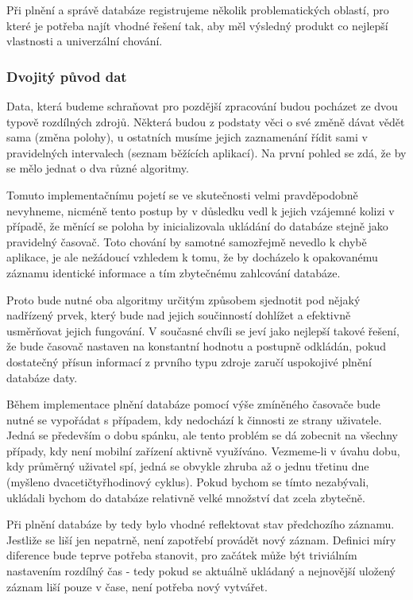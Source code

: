 \documentclass[thesis=M,czech]{FITthesis}[2012/06/26]
\begin{document}
Při plnění a správě databáze registrujeme několik problematických oblastí, pro které je potřeba najít vhodné řešení tak, aby měl výsledný produkt co nejlepší vlastnosti a univerzální chování.

\subsubsection*{Dvojitý původ dat}
Data, která budeme schraňovat pro pozdější zpracování budou pocházet ze dvou typově rozdílných zdrojů. Některá budou z podstaty věci o své změně dávat vědět sama (změna polohy), u ostatních musíme jejich zaznamenání řídit sami v pravidelných intervalech (seznam běžících aplikací). Na první pohled se zdá, že by se mělo jednat o dva různé algoritmy.

Tomuto implementačnímu pojetí se ve skutečnosti velmi pravděpodobně nevyhneme, nicméně tento postup by v důsledku vedl k jejich vzájemné kolizi v případě, že měnící se poloha by inicializovala ukládání do databáze stejně jako pravidelný časovač. Toto chování by samotné samozřejmě nevedlo k chybě aplikace, je ale nežádoucí vzhledem k tomu, že by docházelo k opakovanému záznamu identické informace a tím zbytečnému zahlcování databáze.

Proto bude nutné oba algoritmy určitým způsobem sjednotit pod nějaký nadřízený prvek, který bude nad jejich součinností dohlížet a efektivně usměrňovat jejich fungování. V současné chvíli se jeví jako nejlepší takové řešení, že bude časovač nastaven na konstantní hodnotu a postupně odkládán, pokud dostatečný přísun informací z prvního typu zdroje zaručí uspokojivé plnění databáze daty.

Během implementace plnění databáze pomocí výše zmíněného časovače bude nutné se vypořádat s případem, kdy nedochází k činnosti ze strany uživatele. Jedná se především o dobu spánku, ale tento problém se dá zobecnit na všechny případy, kdy není mobilní zařízení aktivně využíváno. Vezmeme-li v úvahu dobu, kdy průměrný uživatel spí, jedná se obvykle zhruba až o jednu třetinu dne (myšleno dvacetičtyřhodinový cyklus). Pokud bychom se tímto nezabývali, ukládali bychom do databáze relativně velké množství dat zcela zbytečně.

Při plnění databáze by tedy bylo vhodné reflektovat stav předchozího záznamu. Jestliže se liší jen nepatrně, není zapotřebí provádět nový záznam. Definici míry diference bude teprve potřeba stanovit, pro začátek může být triviálním nastavením rozdílný čas - tedy pokud se aktuálně ukládaný a nejnovější uložený záznam liší pouze v čase, není potřeba nový vytvářet.
\end{document}

